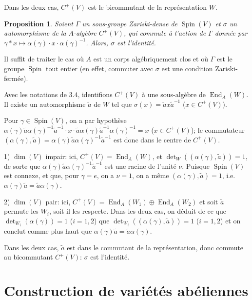 \documentclass[11pt]{amsart}
\theoremstyle{plain}
\newtheorem{proposition}[theoreme]{Proposition}
\theoremstyle{definition}
\theoremstyle{remark}
\begin{document}
Dans les deux cas, $C^+(V)$ est le bicommutant de la repr\'esentation $W$.

\begin{proposition}\label{prop:3.5}
Soient $\Gamma$ un sous-groupe Zariski-dense de $\operatorname{Spin}(V)$ et $\sigma$ un automorphisme de la $A$-alg\`ebre $C^+(V)$, qui commute \`a l'action de $\Gamma$ donn\'ee par $\gamma*x\mapsto\alpha(\gamma)\cdot x\cdot\alpha(\gamma)^{-1}$. Alors, $\sigma$ est l'identit\'e.
\end{proposition}

Il suffit de traiter le cas o\`u $A$ est un corps alg\'ebriquement clos et o\`u $\Gamma$ est le groupe $\operatorname{Spin}$ tout entier (en effet, commuter avec $\sigma$ est une condition Zariski-ferm\'ee).

Avec les notations de 3.4, identifions $C^+(V)$ \`a une sous-alg\`ebre de $\operatorname{End}_A(W)$. Il existe un automorphisme $\tilde{a}$ de $W$ tel que $\sigma(x)=\tilde{a}x\tilde{a}^{-1}$ ($x\in C^+(V)$).

Pour $\gamma\in\operatorname{Spin}(V)$, on a par hypoth\`ese $\alpha(\gamma)\tilde{a}\alpha(\gamma)^{-1}\tilde{a}^{-1}\cdot x\cdot\tilde{a}\alpha(\gamma)\tilde{a}^{-1}\alpha(\gamma)^{-1}=x$ ($x\in C^+(V)$); le commutateur $(\alpha(\gamma),\tilde{a})=\alpha(\gamma)\tilde{a}\alpha(\gamma)^{-1}\tilde{a}^{-1}$ est donc dans le centre de $C^+(V)$.

1) $\dim(V)$ impair: ici, $C^+(V)=\operatorname{End}_A(W)$, et $\det_W((\alpha(\gamma),\tilde{a}))=1$, de sorte que $\alpha(\gamma)\tilde{a}\alpha(\gamma)^{-1}\tilde{a}^{-1}$ est une racine de l'unit\'e $\nu$. Puisque $\operatorname{Spin}(V)$ est connexe, et que, pour $\gamma=e$, on a $\nu=1$, on a m\^eme $(\alpha(\gamma),\tilde{a})=1$, i.e. $\alpha(\gamma)\tilde{a}=\tilde{a}\alpha(\gamma)$.

2) $\dim(V)$ pair: ici, $C^+(V)=\operatorname{End}_A(W_1)\oplus\operatorname{End}_A(W_2)$ et soit $\tilde{a}$ permute les $W_i$, soit il les respecte. Dans les deux cas, on d\'eduit de ce que $\det_{W_i}(\alpha(\gamma))=1$ ($i=1,2$) que $\det_{W_i}((\alpha(\gamma),\tilde{a}))=1$ ($i=1,2$) et on conclut comme plus haut que $\alpha(\gamma)\tilde{a}=\tilde{a}\alpha(\gamma)$.

Dans les deux cas, $\tilde{a}$ est dans le commutant de la repr\'esentation, donc commute au bicommutant $C^+(V)$: $\sigma$ est l'identit\'e.

\section{Construction de vari\'et\'es ab\'eliennes}
\end{document}
